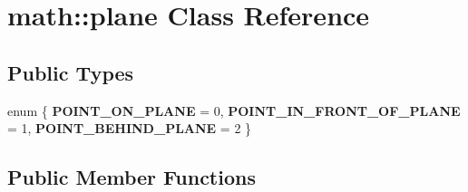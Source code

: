 \hypertarget{classmath_1_1plane}{
\section{math::plane Class Reference}
\label{classmath_1_1plane}
}
\subsection*{Public Types}
\begin{DoxyCompactItemize}
\item 
enum \{ {\bfseries POINT\_\-ON\_\-PLANE} = 0, 
{\bfseries POINT\_\-IN\_\-FRONT\_\-OF\_\-PLANE} = 1, 
{\bfseries POINT\_\-BEHIND\_\-PLANE} = 2
 \}
\end{DoxyCompactItemize}
\subsection*{Public Member Functions}
